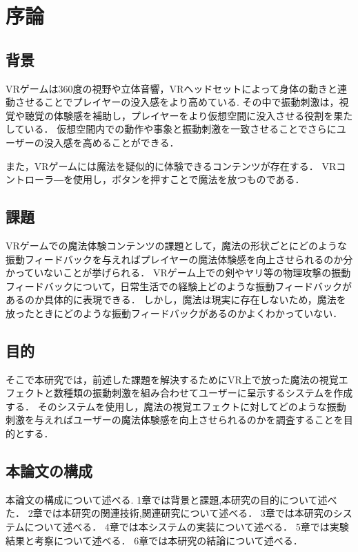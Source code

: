 \chapter{序論}
\section{背景}
VRゲームは360度の視野や立体音響，VRヘッドセットによって身体の動きと連動させることでプレイヤーの没入感をより高めている.
その中で振動刺激は，視覚や聴覚の体験感を補助し，プレイヤーをより仮想空間に没入させる役割を果たしている．
仮想空間内での動作や事象と振動刺激を一致させることでさらにユーザーの没入感を高めることができる．

また，VRゲームには魔法を疑似的に体験できるコンテンツが存在する．
VRコントローラ―を使用し，ボタンを押すことで魔法を放つものである．


\section{課題}
VRゲームでの魔法体験コンテンツの課題として，魔法の形状ごとにどのような振動フィードバックを与えればプレイヤーの魔法体験感を向上させられるのか分かっていないことが挙げられる．
VRゲーム上での剣やヤリ等の物理攻撃の振動フィードバックについて，日常生活での経験上どのような振動フィードバックがあるのか具体的に表現できる．
しかし，魔法は現実に存在しないため，魔法を放ったときにどのような振動フィードバックがあるのかよくわかっていない．


\section{目的}
そこで本研究では，前述した課題を解決するためにVR上で放った魔法の視覚エフェクトと数種類の振動刺激を組み合わせてユーザーに呈示するシステムを作成する．
そのシステムを使用し，魔法の視覚エフェクトに対してどのような振動刺激を与えればユーザーの魔法体験感を向上させられるのかを調査することを目的とする．

\section{本論文の構成}
本論文の構成について述べる.
1章では背景と課題,本研究の目的について述べた．
2章では本研究の関連技術,関連研究について述べる．
3章では本研究のシステムについて述べる．
4章では本システムの実装について述べる．
5章では実験結果と考察について述べる．
6章では本研究の結論について述べる．
